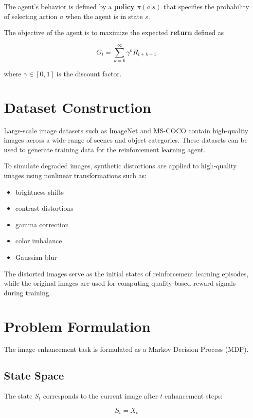 \documentclass[11pt]{article}
\begin{document}
The agent's behavior is defined by a \textbf{policy} $\pi(a|s)$ that specifies the probability of selecting action $a$ when the agent is in state $s$.

The objective of the agent is to maximize the expected \textbf{return} defined as

\[
G_t = \sum_{k=0}^{\infty} \gamma^k R_{t+k+1}
\]

where $\gamma \in [0,1]$ is the discount factor.

\section{Dataset Construction}

Large-scale image datasets such as ImageNet and MS-COCO contain high-quality images across a wide range of scenes and object categories. These datasets can be used to generate training data for the reinforcement learning agent.

To simulate degraded images, synthetic distortions are applied to high-quality images using nonlinear transformations such as:

\begin{itemize}
\item brightness shifts
\item contrast distortions
\item gamma correction
\item color imbalance
\item Gaussian blur
\end{itemize}

The distorted images serve as the initial states of reinforcement learning episodes, while the original images are used for computing quality-based reward signals during training.

\section{Problem Formulation}

The image enhancement task is formulated as a Markov Decision Process (MDP).

\subsection{State Space}

The state $S_t$ corresponds to the current image after $t$ enhancement steps:

\[
S_t = X_t
\]
\end{document}
